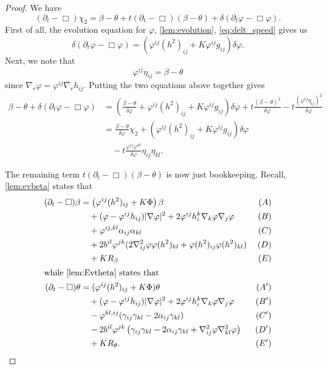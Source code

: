 \documentclass[12pt]{amsart}
\begin{document}
\begin{proof}
We have
\[
(\partial_t - \Box)\chi_2 = \beta - \theta + t(\partial_{t} - \Box)(\beta - \theta) + \delta(\partial_t \varphi - \Box\varphi).
\]
First of all, the evolution equation for \(\varphi\), \cref{lem:evolution}, \cref{eq:delt_speed} gives us
\[
\delta(\partial_t \varphi - \Box\varphi) = \left(\varphi^{ij}(h^2)_{ij} + K\varphi^{ij}g_{ij}\right)\delta\varphi.
\]
Next, we note that
\[
\varphi^{ij} \eta_{ij} = \beta - \theta
\]
since \(\nabla_r \varphi = \varphi^{ij} \nabla_r h_{ij}\). Putting the two equations above together gives
\begin{equation}
\label{eq:deltchi1}
\begin{split}
\beta - \theta + \delta(\partial_t \varphi - \Box\varphi) &= \left(\frac{\beta-\theta}{\delta\varphi} + \varphi^{ij}(h^2)_{ij} + K\varphi^{ij}g_{ij}\right)\delta\varphi + t \frac{(\beta - \theta)^2}{\delta\varphi} - t \frac{(\varphi^{ij}\eta_{ij})^2}{\delta\varphi} \\
&= \frac{\beta-\theta}{\delta\varphi} \chi_2 + \left(\varphi^{ij}(h^2)_{ij} + K\varphi^{ij}g_{ij}\right)\delta\varphi \\
&\quad - t \frac{\varphi^{ij}\varphi^{kl}}{\delta\varphi} \eta_{ij}\eta_{kl}.
\end{split}
\end{equation}

The remaining term \(t(\partial_{t} - \Box)(\beta - \theta)\) is now just bookkeeping. Recall, \cref{lem:evbeta} states that
\begin{align*}
(\partial_{t} - \Box)\beta &= \left(\varphi^{ij}(h^2)_{ij} + K\Phi \right)\beta  & (A) \\
&\quad + (\varphi - \varphi^{ij}h_{ij}) |\nabla\varphi|^{2} + 2\varphi^{ij}h^{k}_{i}\nabla_k \varphi \nabla_j \varphi  & (B) \\
&\quad + \varphi^{ij,kl} \alpha_{ij} \alpha_{kl} & (C) \\
&\quad + 2b^{il}\varphi^{jk} (2\nabla^2_{ij}\varphi\varphi(h^2)_{kl} + \varphi(h^2)_{ij}\varphi(h^2)_{kl}) & (D) \\
&\quad + KR_{\beta}  & (E) \\
\intertext{while \cref{lem:Evtheta} states that}
(\partial_{t} - \Box)\theta &= (\varphi^{ij}(h^2)_{ij} + K\Phi)\theta & (A') \\
&\quad + (\varphi - \varphi^{ij}h_{ij})|\nabla\varphi|^{2} + 2\varphi^{ij}h^{k}_{i}\nabla_k\varphi\nabla_j\varphi & (B') \\
&\quad - \varphi^{kl,ij} (\gamma_{ij}\gamma_{kl}  - 2\alpha_{ij} \gamma_{kl}) & (C') \\
&\quad - 2b^{il} \varphi^{jk} \left(\gamma_{ij} \gamma_{kl} - 2\alpha_{ij} \gamma_{kl} + \nabla^2_{ij}\varphi\nabla^2_{kl}\varphi\right) & (D') \\
&\quad + KR_{\theta}. & (E')
\end{align*}


\end{proof}
\end{document}
